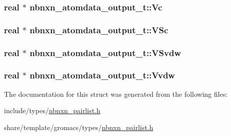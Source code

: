 \hypertarget{structnbnxn__atomdata__output__t_a623138b0a063d684b778cc672fef0817}{
\subsubsection[{\-Vc}]{\setlength{\rightskip}{0pt plus 5cm}real $\ast$ {\bf nbnxn\-\_\-atomdata\-\_\-output\-\_\-t\-::\-Vc}}}\label{structnbnxn__atomdata__output__t_a623138b0a063d684b778cc672fef0817}
\hypertarget{structnbnxn__atomdata__output__t_a3c935eb1f563af167c65a9a171a255ed}{
\subsubsection[{\-V\-Sc}]{\setlength{\rightskip}{0pt plus 5cm}real $\ast$ {\bf nbnxn\-\_\-atomdata\-\_\-output\-\_\-t\-::\-V\-Sc}}}\label{structnbnxn__atomdata__output__t_a3c935eb1f563af167c65a9a171a255ed}
\hypertarget{structnbnxn__atomdata__output__t_aac4a29f4ceb0a703f5a64fca44657ab6}{
\subsubsection[{\-V\-Svdw}]{\setlength{\rightskip}{0pt plus 5cm}real $\ast$ {\bf nbnxn\-\_\-atomdata\-\_\-output\-\_\-t\-::\-V\-Svdw}}}\label{structnbnxn__atomdata__output__t_aac4a29f4ceb0a703f5a64fca44657ab6}
\hypertarget{structnbnxn__atomdata__output__t_adefd315070f08b8425e7c274337af689}{
\subsubsection[{\-Vvdw}]{\setlength{\rightskip}{0pt plus 5cm}real $\ast$ {\bf nbnxn\-\_\-atomdata\-\_\-output\-\_\-t\-::\-Vvdw}}}\label{structnbnxn__atomdata__output__t_adefd315070f08b8425e7c274337af689}


\-The documentation for this struct was generated from the following files\-:\begin{DoxyCompactItemize}
\item 
include/types/\hyperlink{include_2types_2nbnxn__pairlist_8h}{nbnxn\-\_\-pairlist.\-h}\item 
share/template/gromacs/types/\hyperlink{share_2template_2gromacs_2types_2nbnxn__pairlist_8h}{nbnxn\-\_\-pairlist.\-h}\end{DoxyCompactItemize}
